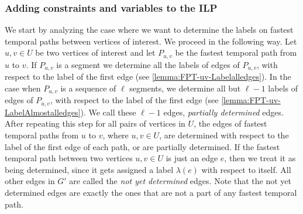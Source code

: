 \documentclass[a4paper,UKenglish,cleveref, autoref, thm-restate, anonymous]{lipics-v2021}
\begin{document}
\subsubsection{Adding constraints and variables to the ILP}
We start by analyzing the case where we want to determine the labels on fastest temporal paths between vertices of interest.
We proceed in the following way.
Let $u,v \in U$ be two vertices of interest and let $P_{u,v}$ be the fastest temporal path from $u$ to $v$.
If $P_{u,v}$ is a segment we determine all the labels of edges of $P_{u,v}$, with respect to the label of the first edge (see \cref{lemma:FPT-uv-Labelalledges}).
In the case when $P_{u,v}$ is a sequence of $\ell$ segments, we determine all but $\ell - 1$ labels of edges of $P_{u,v}$, with respect to the label of the first edge (see \cref{lemma:FPT-uv-LabelAlmostalledges}).
We call these $\ell - 1$ edges, \emph{partially determined} edges.
After repeating this step for all pairs of vertices in $U$,
the edges of fastest temporal paths from $u$ to $v$, where $u,v \in U$, are determined with respect to the label of the first edge of each path,
or are partially determined.
If the fastest temporal path between two vertices $u,v \in U$ is just an edge $e$, then we treat it as being determined, since it gets assigned a label $\lambda(e)$ with respect to itself.
All other edges in $G'$ %
are called the \emph{not yet determined} edges.
Note that the not yet determined edges are exactly the ones that are not a part of any fastest temporal path.
\end{document}
